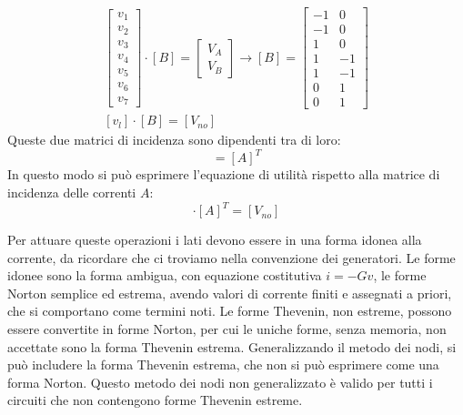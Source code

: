 \documentclass{article}
\numberwithin{equation}{subsection}
\begin{document}
\begin{gather*}
    \begin{bmatrix}
        v_1\\
        v_2\\
        v_3\\
        v_4\\
        v_5\\
        v_6\\
        v_7
    \end{bmatrix}\cdot[B]=\begin{bmatrix}
        V_A\\
        V_B
    \end{bmatrix}\to[B]=\begin{bmatrix}
        -1&0\\
        -1&0\\
        1&0\\
        1&-1\\
        1&-1\\
        0&1\\
        0&1
    \end{bmatrix}\\
    [v_l]\cdot[B]=[V_{no}]
\end{gather*}
Queste due matrici di incidenza sono dipendenti tra di loro:
\begin{equation*}
    [B]=[A]^T
\end{equation*}
In questo modo si può esprimere l'equazione di utilità rispetto alla matrice di incidenza delle correnti $A$:
\begin{equation*}
    [v_l]\cdot[A]^T=[V_{no}]
\end{equation*}

Per attuare queste operazioni i lati devono essere in una forma idonea alla corrente, da ricordare che ci troviamo nella convenzione dei generatori. 
Le forme idonee sono la forma ambigua, con equazione costitutiva $i=-Gv$, le forme Norton semplice ed estrema, avendo valori di corrente finiti e assegnati a priori, che si 
comportano come termini noti. Le forme Thevenin, non estreme, possono essere convertite in forme Norton, per cui le uniche forme, senza memoria, non accettate sono 
la forma Thevenin estrema. Generalizzando il metodo dei nodi, si può includere la forma Thevenin estrema, che non si può esprimere come una forma Norton. 
Questo metodo dei nodi non generalizzato è valido per tutti i circuiti che non contengono forme Thevenin estreme. 
\end{document}
